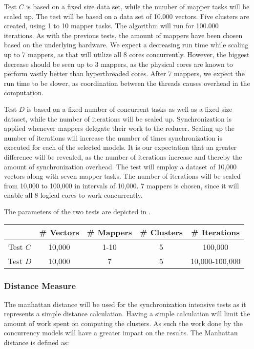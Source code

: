 Test $C$ is based on a fixed size data set, while the number of mapper tasks will be scaled up.  The test will be based on a data set of 10.000 vectors. Five clusters are created, using 1 to 10 mapper tasks. The algorithm will run for 100.000 iterations. As with the previous tests, the amount of mappers have been chosen based on the underlying hardware. We expect a decreasing run time while scaling up to 7 mappers, as that will utilize all 8 cores concurrently. However, the biggest decrease should be seen up to 3 mappers, as the physical cores are known to perform vastly better than hyperthreaded cores\cite{marr2002hyper}. After 7 mappers, we expect the run time to be slower, as coordination between the threads causes overhead in the computation.

Test $D$ is based on a fixed number of concurrent tasks as well as a fixed size dataset, while the number of iterations will be scaled up. Synchronization is applied whenever mappers delegate their work to the reducer. Scaling up the number of iterations will increase the number of times synchronization is executed for each of the selected models. It is our expectation that an greater difference will be revealed, as the number of iterations increase and thereby the amount of synchronization overhead. The test will employ a dataset of 10,000 vectors along with seven mapper tasks. The number of iterations will be scaled from 10,000 to 100,000 in intervals of 10,000. 7 mappers is chosen, since it will enable all 8 logical cores to work concurrently.

The parameters of the two tests are depicted in .

\begin{center}
\begin{table}[h]
\centering
\begin{tabular}{c|cccc}
       & \# Vectors        & \# Mappers			 	& \# Clusters & \# Iterations \\ \hline
Test $C$ & 10,000            & 1-10        			& 5           & 100,000      \\
Test $D$ & 10,000			 & 7          			& 5           & 10,000-100,000
\end{tabular}
\end{table}
 \label{tab:test_description} 
\end{center}

\subsubsection{Distance Measure}
The manhattan distance will be used for the synchronization intensive tests as it represents a simple distance calculation. Having a simple calculation will limit the amount of work spent on computing the clusters. As such the work done by the concurrency models will have a greater impact on the results. The Manhattan distance is defined as\cite[p. 41]{amatriain2011data}:
 
